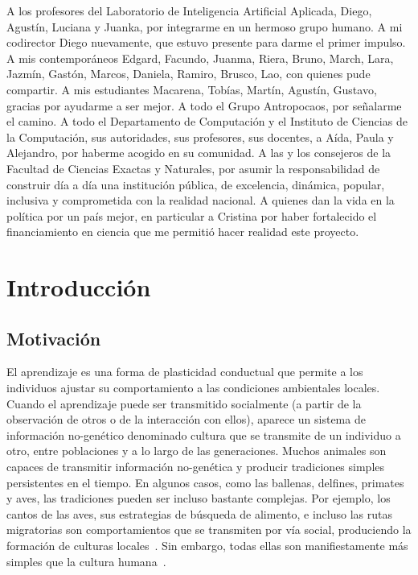 \documentclass[a4paper,11pt]{book}
\makeatletter
\renewcommand{\mainmatter}{\cleardoublepage\@mainmattertrue}
\theoremstyle{definition}
\makeatother
\begin{document}
%
A los profesores del Laboratorio de Inteligencia Artificial Aplicada, Diego, Agust\'in, Luciana y Juanka, por integrarme en un hermoso grupo humano.
%
A mi codirector Diego nuevamente, que estuvo presente para darme el primer impulso.
%
A mis contempor\'aneos Edgard, Facundo, Juanma, Riera, Bruno, March, Lara, Jazm\'in, Gast\'on, Marcos, Daniela, Ramiro, Brusco, Lao, con quienes pude compartir.
%
A mis estudiantes Macarena, Tob\'ias, Mart\'in, Agust\'in, Gustavo, gracias por ayudarme a ser mejor.
%
A todo el Grupo Antropocaos, por se\~nalarme el camino.
%
A todo el Departamento de Computaci\'on y el Instituto de Ciencias de la Computaci\'on, sus autoridades, sus profesores, sus docentes, a A\'ida, Paula y Alejandro, por haberme acogido en su comunidad.
%
A las y los consejeros de la Facultad de Ciencias Exactas y Naturales, por asumir la responsabilidad de construir d\'ia a d\'ia una instituci\'on p\'ublica, de excelencia, din\'amica, popular, inclusiva y comprometida con la realidad nacional.
%
A quienes dan la vida en la pol\'itica por un pa\'is mejor, en particular a Cristina por haber fortalecido el financiamiento en ciencia que me permiti\'o hacer realidad este proyecto.









\mainmatter

\chapter{Introducci\'on} \label{ch:evo}

\section{Motivación}

El aprendizaje es una forma de plasticidad conductual que permite a los individuos ajustar su comportamiento a las condiciones ambientales locales.
%
Cuando el aprendizaje puede ser transmitido socialmente (a partir de la observaci\'on de otros o de la interacci\'on con ellos), aparece un sistema de informaci\'on no-gen\'etico denominado cultura que se transmite de un individuo a otro, entre poblaciones y a lo largo de las generaciones.
%
Muchos animales son capaces de transmitir informaci\'on no-gen\'etica y producir tradiciones simples persistentes en el tiempo.
%
En algunos casos, como las ballenas, delfines, primates y aves, las tradiciones pueden ser incluso bastante complejas.
%
Por ejemplo, los cantos de las aves, sus estrategias de b\'usqueda de alimento, e incluso las rutas migratorias son comportamientos que se transmiten por v\'ia social, produciendo la formaci\'on de culturas locales~\cite{aplin2022-birdsCulture}.
%
Sin embargo, todas ellas son manifiestamente m\'as simples que la cultura humana~\cite{boyd1996-whyCultureIsCommon}.
\end{document}
